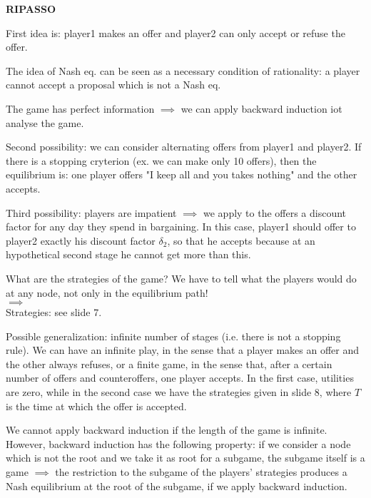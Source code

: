 
%



\bigskip
\noindent \textbf{RIPASSO}

\noindent First idea is: player1 makes an offer and player2 can only accept or 
refuse the offer.

\noindent The idea of Nash eq. can be seen as a necessary condition of 
rationality: a player cannot accept a proposal which is not a Nash eq.

\noindent The game has perfect information $\implies$ we can apply backward 
induction iot analyse the game.

\noindent Second possibility: we can consider alternating offers from player1 
and player2. If there is a stopping cryterion (ex. we can make only 10 offers), 
then the equilibrium is: one player offers "I keep all and you takes nothing" 
and the other accepts.

\noindent Third possibility: players are impatient $\implies$ we apply to the 
offers a discount factor for any day they spend in bargaining. In this case, 
player1 should offer to player2 exactly his discount factor $\delta_2$, so that 
he accepts because at an hypothetical second stage he cannot get more than this.

\noindent What are the strategies of the game? We have to tell what the players 
would do at any node, not only in the equilibrium path!\\
$\implies$\\
Strategies: see slide 7.

\noindent Possible generalization: infinite number of stages (i.e. there is not 
a stopping rule). We can have an infinite play, in the sense that a player makes 
an offer and the other always refuses, or a finite game, in the sense that, 
after a certain number of offers and counteroffers, one player accepts. In 
the first case, utilities are zero, while in the second case we have the 
strategies given in slide 8, where $T$ is the time at which the offer is 
accepted.

\noindent We cannot apply backward induction if the length of the game is 
infinite. However, backward induction has the following property: if we 
consider a node which is not the root and we take it as root for a subgame, 
the subgame itself is a game $\implies$ the restriction to the subgame of the 
players' strategies produces a Nash equilibrium at the root of the subgame, if 
we apply backward induction.

